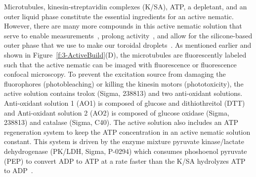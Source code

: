 Microtubules, kinesin-streptavidin complexes (K/SA), ATP, a depletant, and an outer liquid phase constitute the essential ingredients for an active nematic.
However, there are many more compounds in this active nematic solution that serve to enable measurements~\cite{RN3,RN135}, prolong activity~\cite{RN3,RN135}, and allow for the silicone-based outer phase that we use to make our toroidal droplets~\cite{RN135}.
As mentioned earlier and shown in Figure~\ref{f:3-ActiveBuild}(D), the microtubules are fluorescently labeled such that the active nematic can be imaged with fluorescence or fluorescence confocal microscopy.
To prevent the excitation source from damaging the fluorophores (photobleaching) or killing the kinesin motors (phototoxicity), the active solution contains trolox (Sigma, 238813) and two anti-oxidant solutions.
Anti-oxidant solution 1 (AO1) is composed of glucose and dithiothreitol (DTT) and Anti-oxidant solution 2 (AO2) is composed of glucose oxidase (Sigma, 238813) and catalase (Sigma, C40).
The active solution also includes an ATP regeneration system to keep the ATP concentration in an active nematic solution constant.
This system is driven by the enzyme mixture pyruvate kinase/lactate dehydrogenase (PK/LDH, Sigma, P-0294) which consumes phoshoenol pyruvate (PEP) to convert ADP to ATP at a rate faster than the K/SA hydrolyzes ATP to ADP~\cite{RN246}.

